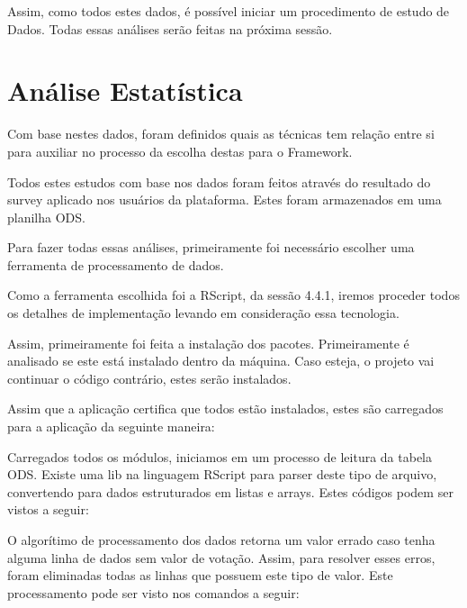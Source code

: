Assim, como todos estes dados, é possível iniciar um procedimento de estudo de Dados.
Todas essas análises serão feitas na próxima sessão.

\section{Análise Estatística}
\label{sec:implementacao_analise_estatistica}
Com base nestes dados, foram definidos quais as técnicas tem relação entre si para auxiliar no processo
da escolha destas para o Framework.

Todos estes estudos com base nos dados foram feitos através do resultado do survey aplicado nos usuários
da plataforma. Estes foram armazenados em uma planilha ODS.

Para fazer todas essas análises, primeiramente foi necessário escolher uma ferramenta de processamento de dados.

Como a ferramenta escolhida foi a RScript, da sessão 4.4.1, iremos proceder todos os detalhes de implementação
levando em consideração essa tecnologia.


Assim, primeiramente foi feita a instalação dos pacotes. Primeiramente é analisado
se este está instalado dentro da máquina. 
Caso esteja, o projeto vai continuar o código contrário, estes serão instalados.



Assim que a aplicação certifica que todos estão instalados, estes são carregados
para a aplicação da seguinte maneira:



Carregados todos os módulos, iniciamos em um processo de leitura da tabela ODS.
Existe uma lib na linguagem RScript para parser deste tipo de arquivo, convertendo
para dados estruturados em listas e arrays. Estes códigos podem ser vistos a seguir:



O algorítimo de processamento dos dados retorna um valor errado caso tenha alguma
linha de dados sem valor de votação. Assim, para resolver esses erros, foram eliminadas
todas as linhas que possuem este tipo de valor. Este processamento pode ser visto nos
comandos a seguir:



